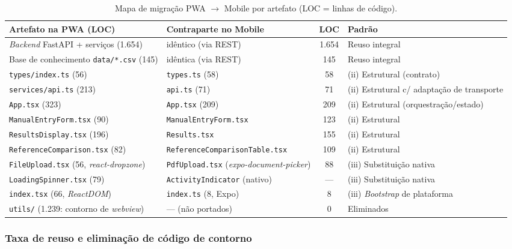 \documentclass[12pt]{article}
\begin{document}
\begin{table}[H]
\centering
\caption{Mapa de migração PWA $\rightarrow$ Mobile por artefato (LOC = linhas de código).}
\label{tab:mapa_migracao}
\scriptsize
\setlength{\tabcolsep}{3pt}
\begin{tabular}{|p{4.2cm}|p{4.4cm}|c|p{2.7cm}|}
\hline
\textbf{Artefato na PWA (LOC)} & \textbf{Contraparte no Mobile} & \textbf{LOC} & \textbf{Padrão} \\ \hline
\emph{Backend} FastAPI + serviços (1.654) & idêntico (via REST) & 1.654 & Reuso integral \\ \hline
Base de conhecimento \texttt{data/*.csv} (145) & idêntica (via REST) & 145 & Reuso integral \\ \hline
\texttt{types/index.ts} (56) & \texttt{types.ts} (58) & 58 & (ii) Estrutural (contrato) \\ \hline
\texttt{services/api.ts} (213) & \texttt{api.ts} (71) & 71 & (ii) Estrutural c/ adaptação de transporte \\ \hline
\texttt{App.tsx} (323) & \texttt{App.tsx} (209) & 209 & (ii) Estrutural (orquestração/estado) \\ \hline
\texttt{ManualEntryForm.tsx} (90) & \texttt{ManualEntryForm.tsx} & 123 & (ii) Estrutural \\ \hline
\texttt{ResultsDisplay.tsx} (196) & \texttt{Results.tsx} & 155 & (ii) Estrutural \\ \hline
\texttt{ReferenceComparison.tsx} (82) & \texttt{ReferenceComparisonTable.tsx} & 109 & (ii) Estrutural \\ \hline
\texttt{FileUpload.tsx} (56, \emph{react-dropzone}) & \texttt{PdfUpload.tsx} (\emph{expo-document-picker}) & 88 & (iii) Substituição nativa \\ \hline
\texttt{LoadingSpinner.tsx} (79) & \texttt{ActivityIndicator} (nativo) & --- & (iii) Substituição nativa \\ \hline
\texttt{index.tsx} (66, \emph{ReactDOM}) & \texttt{index.ts} (8, Expo) & 8 & (iii) \emph{Bootstrap} de plataforma \\ \hline
\texttt{utils/} (1.239: contorno de \emph{webview}) & --- (não portados) & 0 & Eliminados \\ \hline
\end{tabular}
\end{table}

\subsubsection{Taxa de reuso e eliminação de código de contorno}
\end{document}
